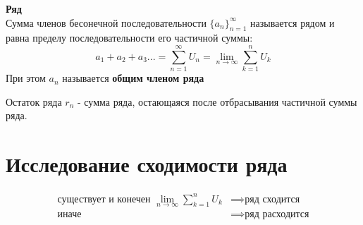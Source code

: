 

\date{4 сентября 2024}

\maketitle

\begin{opr}
    \textbf{Ряд}\\
    Сумма членов бесонечной последовательности
    \(\{a_{n}\}^{\infty}_{n=1}\) называется рядом
    и равна пределу последовательности 
    его частичной суммы:
    \begin{equation}
        a_{1} + a_{2} + a_{3} ... 
        = \sum_{n=1}^{\infty} U_{n}
        = \lim_{n\to\infty}\sum_{k=1}^{n} U_{k}
    \end{equation}
    При этом \(a_{n}\) называется \textbf{общим членом ряда}
\end{opr}

\begin{opr}
    Остаток ряда \(r_{n}\) - сумма ряда, остающаяся
    после отбрасывания частичной суммы ряда.
\end{opr}

\section{Исследование сходимости ряда}
\begin{opr}
    \begin{equation}
        \begin{align*}
            \text{существует и конечен } 
            \lim_{n\to\infty}\sum_{k=1}^{n} U_{k} 
            &\implies \text{ряд сходится} \\
            \text{иначе} 
            &\implies \text{ряд расходится}
        \end{align*}
    \end{equation}
\end{opr}



